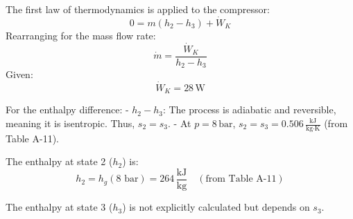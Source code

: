 The first law of thermodynamics is applied to the compressor:  
\[
0 = m (h_2 - h_3) + \dot{W}_K
\]  
Rearranging for the mass flow rate:  
\[
\dot{m} = \frac{\dot{W}_K}{h_2 - h_3}
\]  
Given:  
\[
\dot{W}_K = 28 \, \text{W}
\]  

For the enthalpy difference:  
- \( h_2 - h_3 \): The process is adiabatic and reversible, meaning it is isentropic. Thus, \( s_2 = s_3 \).  
- At \( p = 8 \, \text{bar} \), \( s_2 = s_3 = 0.506 \, \frac{\text{kJ}}{\text{kg·K}} \) (from Table A-11).  

The enthalpy at state 2 (\( h_2 \)) is:  
\[
h_2 = h_g(\text{8 bar}) = 264 \, \frac{\text{kJ}}{\text{kg}} \quad (\text{from Table A-11})
\]  

The enthalpy at state 3 (\( h_3 \)) is not explicitly calculated but depends on \( s_3 \).